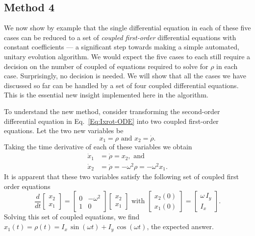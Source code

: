 \subsection{Method 4} 

We now show by example that the single differential equation in each of these five cases can be reduced to a set of \emph{coupled first-order} differential equations with constant coefficients --- a significant step towards making a simple automated, unitary evolution algorithm.  We would expect the five cases to each still require a decision on the number of coupled of equations required to solve for $\rho$ in each case.  Surprisingly, no decision is needed.  We will show that all the cases we have discussed so far can be handled by a set of four coupled differential equations.  This is the essential new insight implemented here in the  algorithm. 

To understand the new method, consider transforming the second-order differential equation in Eq.~\ref{Eq:Ixrot-ODE} into two coupled first-order equations.  Let the two new variables be 
\begin{equation}
x_1 = \rho \text{ and } x_2 = \dot{\rho}.
\end{equation}
Taking the time derivative of each of these variables we obtain 
\begin{subequations}
\begin{align}
\dot{x}_1 & = \dot{\rho} = x_2, \text{ and} \\
\dot{x}_2 & = \ddot{\rho} = - \omega^2 \rho = - \omega^2 x_1.
\end{align}
\end{subequations}
It is apparent that these two variables satisfy the following set of coupled first order equations
\begin{equation}
\frac{d}{dt} \begin{bmatrix} x_2 \\ x_1 \end{bmatrix}
	= \begin{bmatrix} 0 & - \omega^2 \\ 1 & 0 \end{bmatrix}
	  \begin{bmatrix} x_2 \\ x_1 \end{bmatrix}
\text{ with } 
\begin{bmatrix} x_2(0) \\ x_1(0) \end{bmatrix}
	=
	\begin{bmatrix} \omega \, I_{y} \\ I_{x} \end{bmatrix}. \label{Eq:Ixrot-2x2}
\end{equation}
Solving this set of coupled equations, we find $x_1(t) = \rho(t) = I_x \, \sin{(\omega t)} + I_y \, \cos{(\omega t)}$, the expected answer.  

